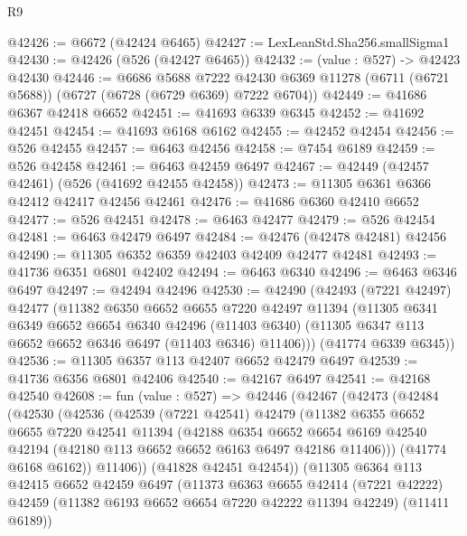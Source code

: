 \begin{lexlean}{R9}
\begin{coremodule}
@42426 := @6672 (@42424 @6465)
@42427 := LexLeanStd.Sha256.smallSigma1
@42430 := @42426 (@526 (@42427 @6465))
@42432 := (value : @527) -> @42423 @42430
@42446 := @6686
    @5688
    @7222
    @42430
    @6369
    @11278
    (@6711 (@6721 @5688))
    (@6727 (@6728 (@6729 @6369) @7222 @6704))
@42449 := @41686 @6367 @42418 @6652
@42451 := @41693 @6339 @6345
@42452 := @41692 @42451
@42454 := @41693 @6168 @6162
@42455 := @42452 @42454
@42456 := @526 @42455
@42457 := @6463 @42456
@42458 := @7454 @6189
@42459 := @526 @42458
@42461 := @6463 @42459 @6497
@42467 := @42449 (@42457 @42461) (@526 (@41692 @42455 @42458))
@42473 := @11305 @6361 @6366 @42412 @42417 @42456 @42461
@42476 := @41686 @6360 @42410 @6652
@42477 := @526 @42451
@42478 := @6463 @42477
@42479 := @526 @42454
@42481 := @6463 @42479 @6497
@42484 := @42476 (@42478 @42481) @42456
@42490 := @11305 @6352 @6359 @42403 @42409 @42477 @42481
@42493 := @41736 @6351 @6801 @42402
@42494 := @6463 @6340
@42496 := @6463 @6346 @6497
@42497 := @42494 @42496
@42530 := @42490
    (@42493
      (@7221 @42497)
      @42477
      (@11382
        @6350
        @6652
        @6655
        @7220
        @42497
        @11394
        (@11305
          @6341
          @6349
          @6652
          @6654
          @6340
          @42496
          (@11403 @6340)
          (@11305 @6347 @113 @6652 @6652 @6346 @6497 (@11403 @6346) @11406)))
      (@41774 @6339 @6345))
@42536 := @11305 @6357 @113 @42407 @6652 @42479 @6497
@42539 := @41736 @6356 @6801 @42406
@42540 := @42167 @6497
@42541 := @42168 @42540
@42608 := fun (value : @527) =>
  @42446
    (@42467
      (@42473
        (@42484
          (@42530
            (@42536
              (@42539
                (@7221 @42541)
                @42479
                (@11382
                  @6355
                  @6652
                  @6655
                  @7220
                  @42541
                  @11394
                  (@42188
                    @6354
                    @6652
                    @6654
                    @6169
                    @42540
                    @42194
                    (@42180 @113 @6652 @6652 @6163 @6497 @42186 @11406)))
                (@41774 @6168 @6162))
              @11406))
          (@41828 @42451 @42454))
        (@11305
          @6364
          @113
          @42415
          @6652
          @42459
          @6497
          (@11373
            @6363
            @6655
            @42414
            (@7221 @42222)
            @42459
            (@11382 @6193 @6652 @6654 @7220 @42222 @11394 @42249)
            (@11411 @6189))

\end{coremodule}
\end{lexlean}
